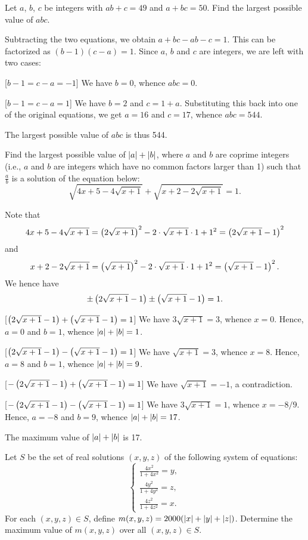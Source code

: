 \begin{question}[544]\label{A::2022-O-1-11}
    Let $a$, $b$, $c$ be integers with $ab + c = 49$ and $a + bc = 50$. Find the largest possible value of $abc$.
\end{question}

Subtracting the two equations, we obtain $a + bc - ab - c = 1$. This can be factorized as $(b-1)(c-a) = 1$. Since $a$, $b$ and $c$ are integers, we are left with two cases:

[$b-1 = c-a = -1$] We have $b = 0$, whence $abc = 0$.

[$b-1 = c-a = 1$] We have $b = 2$ and $c = 1 + a$. Substituting this back into one of the original equations, we get $a = 16$ and $c = 17$, whence $abc = 544$.

The largest possible value of $abc$ is thus 544.

\begin{question}[17]\label{A::2022-O-1-12}
    Find the largest possible value of $\left\lvert a \right\rvert + \left\lvert b \right\rvert$, where $a$ and $b$ are coprime integers (i.e., $a$ and $b$ are integers which have no common factors larger than 1) such that $\frac{a}{b}$ is a solution of the equation below: \[\sqrt{4x + 5 - 4\sqrt{x+1}} + \sqrt{x+2 - 2\sqrt{x+1}} = 1.\]
\end{question}

Note that \[4x + 5 - 4\sqrt{x+1} = \left( 2\sqrt{x+1} \right)^2 - 2\cdot\sqrt{x+1}\cdot1 + 1^2 = \left( 2\sqrt{x+1} - 1 \right)^2\] and \[x + 2 - 2\sqrt{x+1} = \left( \sqrt{x+1} \right)^2 - 2\cdot\sqrt{x+1}\cdot 1 + 1^2 = \left( \sqrt{x+1} - 1 \right)^2.\] We hence have \[\pm \left( 2\sqrt{x+1} - 1 \right) \pm \left( \sqrt{x+1} - 1 \right) = 1.\]

[$\left( 2\sqrt{x+1} - 1 \right) + \left( \sqrt{x+1} - 1 \right) = 1$] We have $3\sqrt{x+1} = 3$, whence $x = 0$. Hence, $a = 0$ and $b = 1$, whence $\left\lvert a \right\rvert + \left\lvert b \right\rvert = 1$.

[$\left( 2\sqrt{x+1} - 1 \right) - \left( \sqrt{x+1} - 1 \right) = 1$] We have $\sqrt{x+1} = 3$, whence $x = 8$. Hence, $a = 8$ and $b = 1$, whence $\left\lvert a \right\rvert + \left\lvert b \right\rvert = 9$.

[$-\left( 2\sqrt{x+1} - 1 \right) + \left( \sqrt{x+1} - 1 \right) = 1$] We have $\sqrt{x+1} = -1$, a contradiction.

[$-\left( 2\sqrt{x+1} - 1 \right) - \left( \sqrt{x+1} - 1 \right) = 1$] We have $3\sqrt{x+1} = 1$, whence $x = -8/9$. Hence, $a = -8$ and $b = 9$, whence $\left\lvert a \right\rvert + \left\lvert b \right\rvert = 17$.

The maximum value of $\left\lvert a \right\rvert + \left\lvert b \right\rvert$ is 17.

\begin{question}[3000]\label{A::2022-O-1-13}
    Let $S$ be the set of real solutions $(x, y, z)$ of the following system of equations: \[\left\{
        \begin{aligned}
            \frac{4x^2}{1 + 4x^2} = y,\\
            \frac{4y^2}{1 + 4y^2} = z,\\
            \frac{4z^2}{1 + 4z^2} = x.
        \end{aligned}\right.\] For each $(x, y, z) \in S$, define $m(x, y, z) = 2000(\left\lvert x \right\rvert + \left\lvert y \right\rvert + \left\lvert z \right\rvert)$. Determine the maximum value of $m(x, y, z)$ over all $(x, y, z) \in S$.
\end{question}

